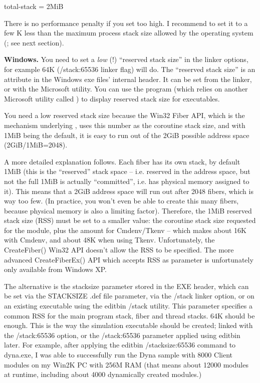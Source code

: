 \begin{inifile}
[General]
total-stack = 2MiB
\end{inifile}

There is no performance penalty if you set  too high. I
recommend to set it to a few K less than the maximum process stack
size allowed by the operating system (; see
next section).


\textbf{Windows.}
You need to set a \textit{low} (!) ``reserved stack size''
in the linker options, for example 64K (/stack:65536 linker flag) will do.
The ``reserved stack size'' is an attribute in the Windows exe
files' internal header. It can be set from the linker, or with
the  Microsoft utility. You can use the 
program (which relies on another Microsoft utility called )
to display reserved stack size for executables.

You need a low reserved stack size because the Win32 Fiber API,
which is the mechanism underlying , uses
this number as the coroutine stack size, and with 1MiB being the default,
it is easy to run out of the 2GiB possible address space (2GiB/1MiB=2048).

A more detailed explanation follows.
Each fiber has its own stack, by default 1MiB (this is the ``reserved''
stack space -- i.e. reserved in the address space, but not the full
1MiB is actually ``committed'', i.e. has physical memory assigned to it).
This means that a 2GiB address space will run out after 2048 fibers,
which is way too few. (In practice, you won't even be able to create
this many fibers, because physical memory is also a limiting factor).
Therefore, the 1MiB reserved stack size (RSS) must be set to a smaller
value: the coroutine stack size requested for the module, plus
the  amount for Cmdenv/Tkenv -- which makes
about 16K with Cmdenv, and about 48K when using Tkenv.
Unfortunately, the CreateFiber() Win32 API doesn't allow the RSS to be
specified. The more advanced CreateFiberEx() API which accepts RSS as
parameter is unfortunately only available from Windows XP.

The alternative is the stacksize parameter stored in the EXE header,
which can be set
via the STACKSIZE .def file parameter, via the /stack linker option,
or on an existing executable using the editbin /stack utility.
This parameter specifies a common RSS for the main program stack,
fiber and thread stacks. 64K should be enough. This is the way the
simulation executable should be created; linked with the /stack:65536
option, or the /stack:65536 parameter applied using editbin later.
For example, after applying the editbin /stacksize:65536 command to
dyna.exe, I was able to successfully run the Dyna sample with 8000
Client modules on my Win2K PC with 256M RAM (that means about 12000
modules at runtime, including about 4000 dynamically created modules.)


